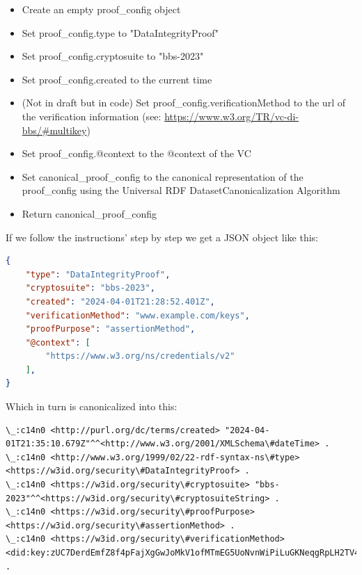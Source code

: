 \documentclass[
	a4paper               %
	,bibliography=totoc   %
	,listof=totoc         %
	,monolingual
	twoside=false,
]{bfhthesis}              %
\begin{document}
\begin{itemize}
	\item Create an empty proof\_config object
	\item Set proof\_config.type to "DataIntegrityProof"
	\item Set proof\_config.cryptosuite to "bbs-2023"
	\item Set proof\_config.created to the current time
	\item (Not in draft but in code) Set proof\_config.verificationMethod to the url of the verification information (see: \url{https://www.w3.org/TR/vc-di-bbs/#multikey})
	\item Set proof\_config.@context to the @context of the VC
	\item Set canonical\_proof\_config to the canonical representation of the proof\_config using the Universal RDF DatasetCanonicalization Algorithm\cite{rdf}
	\item Return canonical\_proof\_config
\end{itemize}

If we follow the instructions' step by step we get a JSON object like this:
\begin{lstlisting}[language=json,firstnumber=1,caption={Example VC},captionpos=b]
{
	"type": "DataIntegrityProof",
	"cryptosuite": "bbs-2023",
	"created": "2024-04-01T21:28:52.401Z",
	"verificationMethod": "www.example.com/keys",
	"proofPurpose": "assertionMethod",
	"@context": [
		"https://www.w3.org/ns/credentials/v2"
	],
}
\end{lstlisting}

Which in turn is canonicalized into this:

\begin{lstlisting}[language=canon,firstnumber=1,caption={Example VC canonicalized},captionpos=b]
\_:c14n0 <http://purl.org/dc/terms/created> "2024-04-01T21:35:10.679Z"^^<http://www.w3.org/2001/XMLSchema\#dateTime> .
\_:c14n0 <http://www.w3.org/1999/02/22-rdf-syntax-ns\#type> <https://w3id.org/security\#DataIntegrityProof> .
\_:c14n0 <https://w3id.org/security\#cryptosuite> "bbs-2023"^^<https://w3id.org/security\#cryptosuiteString> .
\_:c14n0 <https://w3id.org/security\#proofPurpose> <https://w3id.org/security\#assertionMethod> .
\_:c14n0 <https://w3id.org/security\#verificationMethod> <did:key:zUC7DerdEmfZ8f4pFajXgGwJoMkV1ofMTmEG5UoNvnWiPiLuGKNeqgRpLH2TV4Xe5mJ2cXV76gRN7LFQwapF1VFu6x2yrr5ci1mXqC1WNUrnHnLgvfZfMH7h6xP6qsf9EKRQrPQ\#zUC7DerdEmfZ8f4pFajXgGwJoMkV1ofMTmEG5UoNvnWiPiLuGKNeqgRpLH2TV4Xe5mJ2cXV76gRN7LFQwapF1VFu6x2yrr5ci1mXqC1WNUrnHnLgvfZfMH7h6xP6qsf9EKRQrPQ> .
\end{lstlisting}
\end{document}
